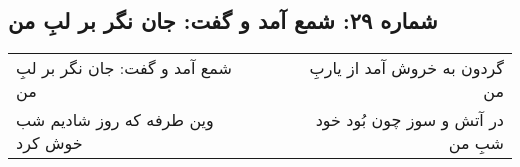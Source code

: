 \begin{center}
\section*{شماره ۲۹: شمع آمد و گفت: جان نگر بر لبِ من}
\label{sec:029}
\begin{longtable}{l p{0.5cm} r}
شمع آمد و گفت: جان نگر بر لبِ من
&&
گردون به خروش آمد از یاربِ من
\\
وین طرفه که روز شادیم شب خوش کرد
&&
در آتش و سوز چون بُود خود شبِ من
\\
\end{longtable}
\end{center}
